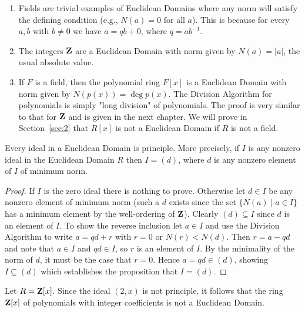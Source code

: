     \begin{example}
        \phantom{a}
        \begin{enumerate}[label = (\arabic*)]
            \item Fields are trivial examples of Euclidean Domains where any norm will satisfy the defining condition (e.g., $N(a) = 0$ for all $a$). This is because for every $a,b$ with $b\neq 0$ we have $a = qb + 0$, where $q = ab^{-1}$.
            \item The integers $\mathbf{Z}$ are a Euclidean Domain with norm given by $N(a) = |a|$, the usual absolute value.
            \item If $F$ is a field, then the polynomial ring $F[x]$ is a Euclidean Domain with norm given by $N(p(x)) = \deg{p(x)}$. The Division Algorithm for polynomials is simply "long division" of polynomials. The proof is very similar to that for $\mathbf{Z}$ and is given in the next chapter. We will prove in Section~\ref{sec:2} that $R[x]$ is not a Euclidean Domain if $R$ is not a field.
        \end{enumerate}
    \end{example}

    \begin{proposition}\label{prop:1.1.1}
        Every ideal in a Euclidean Domain is principle. More precisely, if $I$ is any nonzero ideal in the Euclidean Domain $R$ then $I = (d)$, where $d$ is any nonzero element of $I$ of minimum norm.
    \end{proposition}
        \begin{proof}
            If $I$ is the zero ideal there is nothing to prove. Otherwise let $d \in I$ be any nonzero element of minimum norm (such a $d$ exists since the set $\{N(a) \mid a \in I\}$ has a minimum element by the well-ordering of $\mathbf{Z}$). Clearly $(d) \subseteq I$ since $d$ is an element of $I$. To show the reverse inclusion let $a \in I$ and use the Division Algorithm to write $a = qd + r$ with $r = 0$ or $N(r) < N(d)$. Then $r = a - qd$ and note that $a \in I$ and $qd \in I$, so $r$ is an element of $I$. By the minimality of the norm of $d$, it must be the case that $r = 0$. Hence $a = qd \in (d)$, showing $I \subseteq (d)$ which establishes the proposition that $I = (d)$.
        \end{proof}

    \begin{example}
        Let $R = \mathbf{Z}[x]$. Since the ideal $(2,x)$ is not principle, it follows that the ring $\mathbf{Z}[x]$ of polynomials with integer coefficients is not a Euclidean Domain.
    \end{example}

